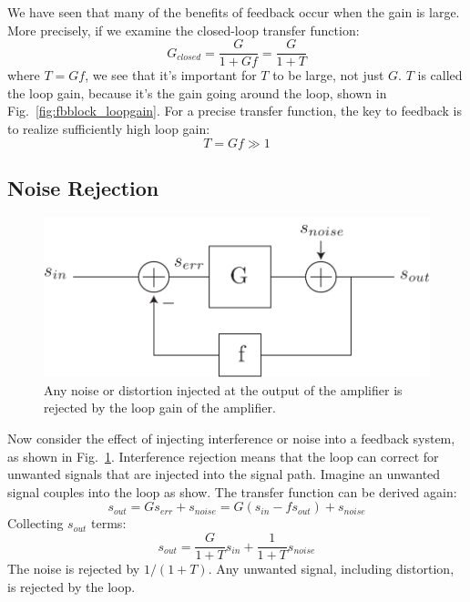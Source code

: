 We have seen that many of the benefits of feedback occur when the gain is large.  More precisely, if we examine the closed-loop transfer function:
\begin{equation}
	{G_{closed}} = \frac{G}{{1 + Gf}} = \frac{G}{{1 + T}}
\end{equation}
where $T = Gf$, we see that it's important for $T$ to be large, not just $G$.  $T$ is called the loop gain, because it's the gain going around the loop, shown in Fig.~\ref{fig:fbblock_loopgain}.  For a precise transfer function, the key to feedback is to realize sufficiently high loop gain:
\begin{equation}
	T = Gf \gg 1
\end{equation}
\subsection{Noise Rejection}
\begin{figure}[tb]
\begin{center}
\includegraphics[scale=.7]{fbblock_noise}
\end{center}
\caption{Any noise or distortion injected at the output of the amplifier is rejected by the loop gain of the amplifier.}
\label{fig:fbblock_noise}
\end{figure}

Now consider the effect of injecting interference or noise into a feedback system, as shown in Fig.~\ref{fig:fbblock_noise}. Interference rejection means that the loop can correct for unwanted signals that are injected into the signal path.  Imagine an unwanted signal couples into the loop as show.  The transfer function can be derived again:
\begin{equation}
	{s_{out}} = G{s_{err}} + {s_{noise}} = G({s_{in}} - f{s_{out}}) + {s_{noise}}
\end{equation}
Collecting $s_{out}$ terms:
\begin{equation}
	{s_{out}} = \frac{G}{{1 + T}}{s_{in}} + \frac{1}{{1 + T}}{s_{noise}}
\end{equation}
The noise is rejected by $1/(1+T)$. Any unwanted signal, including distortion, is rejected by the loop.
